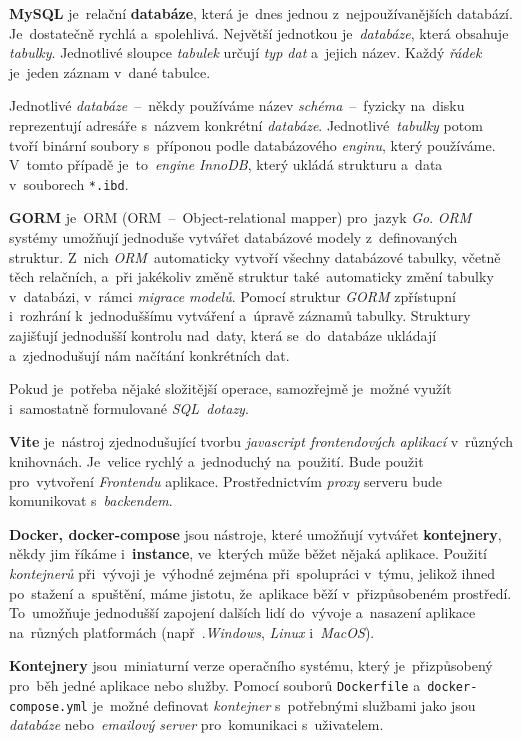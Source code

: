 \documentclass[11pt,a4paper]{report}
\begin{document}
            \textbf{MySQL} je~relační \textbf{databáze}, která je~dnes jednou z~nejpoužívanějších databází. Je~dostatečně rychlá a~spolehlivá. Největší jednotkou je~\emph{databáze}, která obsahuje \emph{tabulky}. Jednotlivé sloupce \emph{tabulek} určují \emph{typ dat} a~jejich název. Každý \emph{řádek} je~jeden záznam v~dané tabulce.\cite{databases21}
            
            Jednotlivé \emph{databáze}~--~někdy používáme název \emph{schéma}~--~fyzicky na~disku reprezentují adresáře s~názvem konkrétní \emph{databáze}. Jednotlivé~\emph{tabulky} potom tvoří binární soubory s~příponou podle databázového \emph{enginu}, který používáme. V~tomto případě je~to~\emph{engine} \emph{InnoDB}, který ukládá strukturu a~data v~souborech \texttt{*.ibd}. \cite{MySQLInnoDB}
            
            \textbf{GORM} je~ORM (ORM~--~Object-relational mapper) pro~jazyk \emph{Go}. \emph{ORM} systémy umožňují jednoduše vytvářet databázové modely z~definovaných struktur. Z~nich \emph{ORM}~automaticky vytvoří všechny databázové tabulky, včetně těch relačních, a~při jakékoliv změně struktur také~automaticky změní tabulky v~databázi, v~rámci \emph{migrace modelů}. Pomocí struktur \emph{GORM} zpřístupní i~rozhrání k~jednoduššímu vytváření a~úpravě záznamů tabulky. Struktury zajišťují jednodušší kontrolu nad~daty, která se~do~databáze ukládají a~zjednodušují nám načítání konkrétních dat.

            Pokud je~potřeba nějaké složitější operace, samozřejmě je~možné využít i~samostatně formulované \emph{SQL~dotazy}. \cite{gormGORM, freecodecamp:orm}

            \textbf{Vite} je~nástroj zjednodušující tvorbu \emph{javascript frontendových aplikací} v~různých knihovnách. Je~velice rychlý a~jednoduchý na~použití. Bude použit pro~vytvoření \emph{Frontendu} aplikace. Prostřednictvím \emph{proxy} serveru bude komunikovat s~\emph{backendem}.

            \textbf{Docker, docker-compose} jsou nástroje, které umožňují vytvářet \textbf{kontejnery}, někdy jim říkáme i~\textbf{instance}, ve~kterých může běžet nějaká aplikace. Použití \emph{kontejnerů} při~vývoji je~výhodné zejména při~spolupráci v~týmu, jelikož ihned po~stažení a~spuštění, máme jistotu, že~aplikace běží v~přizpůsobeném prostředí. To~umožňuje jednodušší zapojení dalších lidí do~vývoje a~nasazení aplikace na~různých platformách (např~.\emph{Windows}, \emph{Linux} i~\emph{MacOS}).

            \textbf{Kontejnery} jsou~miniaturní verze operačního systému, který je~přizpůsobený pro~běh jedné aplikace nebo služby. Pomocí souborů \texttt{Dockerfile} a~\texttt{docker-compose.yml} je~možné definovat \emph{kontejner} s~potřebnými službami jako jsou \emph{databáze} nebo~\emph{emailový server} pro~komunikaci s~uživatelem.
\end{document}
